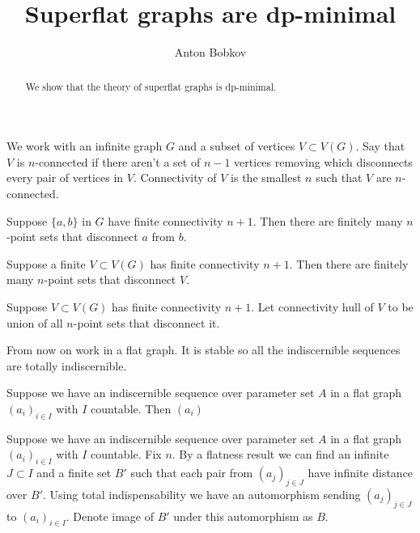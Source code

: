 \documentclass{amsart}
\begin{document}
\title{Superflat graphs are dp-minimal}
\author{Anton Bobkov}

\begin{abstract}
	We show that the theory of superflat graphs is dp-minimal.
\end{abstract}

\maketitle

We work with an infinite graph $G$ and a subset of vertices $V \subset V(G)$. Say that $V$ is $n$-connected if there aren't a set of $n-1$ vertices removing which disconnects every pair of vertices in $V$. Connectivity of $V$ is the smallest $n$ such that $V$ are $n$-connected.

\begin{Lemma}
	Suppose $\{a,b\}$ in $G$ have finite connectivity $n+1$. Then there are finitely many $n$-point sets that disconnect $a$ from $b$.
\end{Lemma}

\begin{Corollary}
	Suppose a finite $V \subset V(G)$ has finite connectivity $n+1$. Then there are finitely many $n$-point sets that disconnect $V$.
\end{Corollary}

\begin{Definition}
	Suppose $V \subset V(G)$ has finite connectivity $n+1$. Let connectivity hull of $V$ to be union of all $n$-point sets that disconnect it.
\end{Definition}

From now on work in a flat graph. It is stable so all the indiscernible sequences are totally indiscernible.

\begin{Lemma}
	Suppose we have an indiscernible sequence over parameter set $A$ in a flat graph $(a_i)_{i \in I}$ with $I$ countable. Then $(a_i)$
\end{Lemma}

Suppose we have an indiscernible sequence over parameter set $A$ in a flat graph $(a_i)_{i \in I}$ with $I$ countable. Fix $n$. By a flatness result we can find an infinite $J \subset I$ and a finite set $B'$ such that each pair from $(a_j)_{j \in J}$ have infinite distance over $B'$. Using total 
indispensability we have an automorphism sending $(a_j)_{j \in J}$ to $(a_i)_{i \in I}$. Denote image of $B'$ under this automorphism as $B$. 
\end{document}
